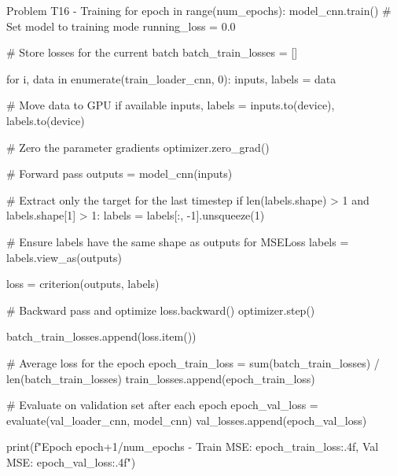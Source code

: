 \documentclass[12pt, a4paper]{article}
\begin{document}
                \begin{codeblock}{Problem T16 - Training}
                    for epoch in range(num_epochs):
                        model_cnn.train() # Set model to training mode
                        running_loss = 0.0
                        
                        # Store losses for the current batch
                        batch_train_losses = [] 
                        
                        for i, data in enumerate(train_loader_cnn, 0):
                            inputs, labels = data
                            
                            # Move data to GPU if available
                            inputs, labels = inputs.to(device), labels.to(device)
                            
                            # Zero the parameter gradients
                            optimizer.zero_grad()

                            # Forward pass
                            outputs = model_cnn(inputs)

                            # Extract only the target for the last timestep
                            if len(labels.shape) > 1 and labels.shape[1] > 1:
                                labels = labels[:, -1].unsqueeze(1)

                            # Ensure labels have the same shape as outputs for MSELoss
                            labels = labels.view_as(outputs)
                            
                            loss = criterion(outputs, labels)
                            
                            # Backward pass and optimize
                            loss.backward()
                            optimizer.step()

                            batch_train_losses.append(loss.item())

                        # Average loss for the epoch
                        epoch_train_loss = sum(batch_train_losses) / len(batch_train_losses)
                        train_losses.append(epoch_train_loss)
                        
                        # Evaluate on validation set after each epoch
                        epoch_val_loss = evaluate(val_loader_cnn, model_cnn)
                        val_losses.append(epoch_val_loss)
                        
                        print(f"Epoch {epoch+1}/{num_epochs} - Train MSE: {epoch_train_loss:.4f}, Val MSE: {epoch_val_loss:.4f}")
                \end{codeblock}
            
\end{document}
